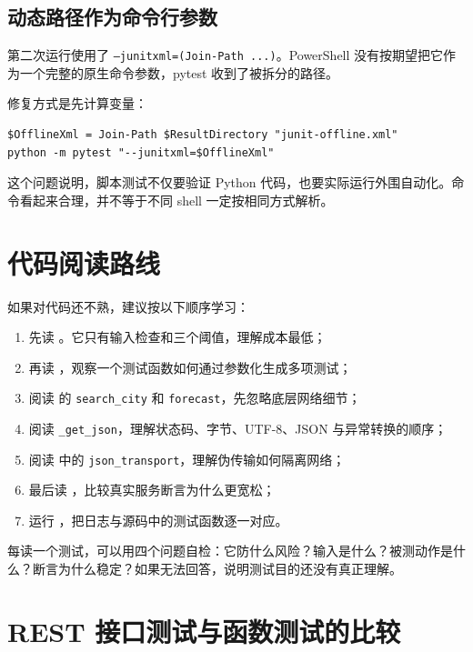 \documentclass[UTF8,zihao=-4,a4paper]{ctexart}
\newcommand{\code}[1]{\texttt{#1}}
\begin{document}
\subsection{动态路径作为命令行参数}

第二次运行使用了 \code{--junitxml=(Join-Path ...)}。PowerShell 没有按期望把它作为一个完整的原生命令参数，pytest 收到了被拆分的路径。

修复方式是先计算变量：

\begin{lstlisting}[style=shellstyle]
$OfflineXml = Join-Path $ResultDirectory "junit-offline.xml"
python -m pytest "--junitxml=$OfflineXml"
\end{lstlisting}

这个问题说明，脚本测试不仅要验证 Python 代码，也要实际运行外围自动化。命令看起来合理，并不等于不同 shell 一定按相同方式解析。

\section{代码阅读路线}

如果对代码还不熟，建议按以下顺序学习：

\begin{enumerate}
  \item 先读 。它只有输入检查和三个阈值，理解成本最低；
  \item 再读 ，观察一个测试函数如何通过参数化生成多项测试；
  \item 阅读  的 \code{search\_city} 和 \code{forecast}，先忽略底层网络细节；
  \item 阅读 \code{\_get\_json}，理解状态码、字节、UTF-8、JSON 与异常转换的顺序；
  \item 阅读  中的 \code{json\_transport}，理解伪传输如何隔离网络；
  \item 最后读 ，比较真实服务断言为什么更宽松；
  \item 运行 ，把日志与源码中的测试函数逐一对应。
\end{enumerate}

每读一个测试，可以用四个问题自检：它防什么风险？输入是什么？被测动作是什么？断言为什么稳定？如果无法回答，说明测试目的还没有真正理解。

\section{REST 接口测试与函数测试的比较}
\end{document}

